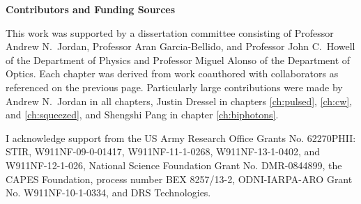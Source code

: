 \clearpage
\thispagestyle{empty}
\begin{center}
  \textbf{Contributors and Funding Sources}
\end{center}

This work was supported by a dissertation committee consisting of Professor Andrew N.~Jordan, Professor Aran Garcia-Bellido, and Professor John C.~Howell of the Department of Physics and Professor Miguel Alonso of the Department of Optics.  Each chapter was derived from work coauthored with collaborators as referenced on the previous page.  Particularly large contributions were made by Andrew N.~Jordan in all chapters, Justin Dressel in chapters \ref{ch:pulsed}, \ref{ch:cw}, and \ref{ch:squeezed}, and Shengshi Pang in chapter \ref{ch:biphotons}.

I acknowledge support from the US Army Research Office Grants No. 62270PHII: STIR, W911NF-09-0-01417, W911NF-11-1-0268, W911NF-13-1-0402, and W911NF-12-1-026,  National Science Foundation Grant No. DMR-0844899, the CAPES Foundation, process number BEX 8257/13-2, ODNI-IARPA-ARO Grant No. W911NF-10-1-0334, and DRS Technologies. 

